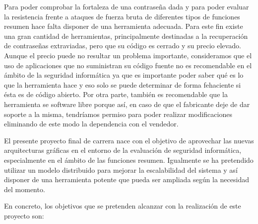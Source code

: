 Para poder comprobar la fortaleza de una contraseña dada y para poder evaluar la resistencia frente a ataques de fuerza bruta de diferentes tipos de funciones resumen hace falta disponer de una herramienta adecuada. Para este fin existe una gran cantidad de herramientas, principalmente destinadas a la recuperación de contraseñas extraviadas, pero que su código es cerrado y su precio elevado. Aunque el precio puede no resultar un problema importante, consideramos que el uso de aplicaciones que no suministran su código fuente no es recomendable en el ámbito de la seguridad informática ya que es importante poder saber qué es lo que la herramienta hace y eso solo se puede determinar de forma fehaciente si ésta es de código abierto. Por otra parte, también es recomendable que la herramienta se software libre porque así, en caso de que el fabricante deje de dar soporte a la misma, tendríamos permiso para poder realizar modificaciones eliminando de este modo la dependencia con el vendedor.

El presente proyecto final de carrera nace con el objetivo de aprovechar las nuevas arquitecturas gráficas en el entorno de la evaluación de seguridad informática, especialmente en el ámbito de las funciones resumen. Igualmente se ha pretendido utilizar un modelo distribuido para mejorar la escalabilidad del sistema y así disponer de una herramienta potente que pueda ser ampliada según la necesidad del momento.

En concreto, los objetivos que se pretenden alcanzar con la realización de este proyecto son:

